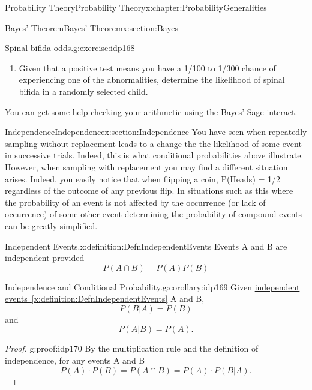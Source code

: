 \documentclass[oneside,10pt,]{book}
\newcommand{\xreffont}{\relax}
\numberwithin{equation}{section}
\begin{document}
\begin{chapterptx}{Probability Theory}{}{Probability Theory}{}{}{x:chapter:ProbabilityGeneralities}
\begin{sectionptx}{Bayes' Theorem}{}{Bayes' Theorem}{}{}{x:section:Bayes}
\begin{inlineexercise}{Spinal bifida odds.}{g:exercise:idp168}
\begin{enumerate}
\item{}Given that a positive test means you have a 1\slash{}100 to 1\slash{}300 chance of experiencing one of the abnormalities, determine the likelihood of spinal bifida in a randomly selected child.%
\end{enumerate}
You can get some help checking your arithmetic using the Bayes' Sage interact.%
\end{inlineexercise}%
\end{sectionptx}
%
%
\typeout{************************************************}
\typeout{************************************************}
%
\begin{sectionptx}{Independence}{}{Independence}{}{}{x:section:Independence}
You have seen when repeatedly sampling without replacement leads to a change the the likelihood of some event in successive trials. Indeed, this is what conditional probabilities above illustrate. However, when sampling with replacement you may find a different situation arises. Indeed, you easily notice that when flipping a coin, P(Heads) = 1\slash{}2 regardless of the outcome of any previous flip.  In situations such as this where the probability of an event is not affected by the occurrence (or lack of occurrence) of some other event determining the probability of compound events can be greatly simplified.%
\begin{definition}{Independent Events.}{x:definition:DefnIndependentEvents}%
Events A and B are independent provided%
\begin{equation*}
P(A \cap B) = P(A) P(B)
\end{equation*}
%
\end{definition}
\begin{corollary}{Independence and Conditional Probability.}{}{g:corollary:idp169}%
Given \hyperref[x:definition:DefnIndependentEvents]{independent events~{\xreffont\ref{x:definition:DefnIndependentEvents}}} A and B,%
\begin{equation*}
P(B | A) = P(B)
\end{equation*}
and%
\begin{equation*}
P(A | B) = P(A).
\end{equation*}
%
\end{corollary}
\begin{proof}{}{g:proof:idp170}
By the multiplication rule and the definition of independence, for any events A and B%
\begin{equation*}
P(A) \cdot P(B) = P(A \cap B) = P(A) \cdot P(B | A) .
\end{equation*}

\end{proof}
\end{sectionptx}
\end{chapterptx}
\end{document}
